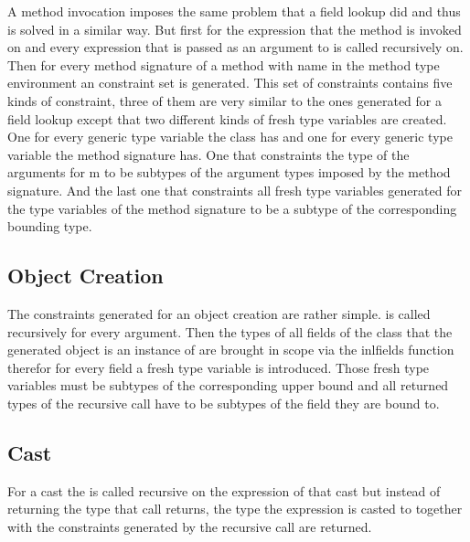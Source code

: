 A method invocation imposes the same problem that a field lookup did and thus is solved in a similar way. But first for the
expression that the method  is invoked on and every expression that is passed as an argument to  
is called recursively on. Then for every method signature of a method with name  in the method type environment an constraint
set is generated. This set of constraints contains five kinds of constraint, three of them are very similar to the ones generated for a
field lookup except that two different kinds of fresh type variables are created. One for every generic type variable the class has and
one for every generic type variable the method signature has. One that constraints the type of the arguments for m to be subtypes of the
argument types imposed by the method signature. And the last one that constraints all fresh type variables generated for the type variables
of the method signature to be a subtype of the corresponding bounding type.

\subsection{Object Creation}

The constraints generated for an object creation are rather simple.  is called recursively for every argument. Then the types of all
fields of the class that the generated object is an instance of are brought in scope via the inl{fields} function therefor for every field a fresh type variable is introduced.
Those fresh type variables must be subtypes of the corresponding upper bound and all returned types of the recursive call have to be subtypes of the field they are bound to.

\subsection{Cast}

For a cast the  is called recursive on the expression of that cast but instead of returning the type that call returns, the type the expression is casted to together with the constraints generated by the recursive call are returned.

